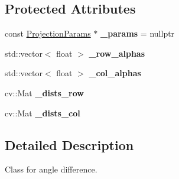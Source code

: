 \subsection*{Protected Attributes}
\begin{DoxyCompactItemize}
\item 
\hypertarget{classdepth__clustering_1_1LineDistDiffPrecomputed_aeb0f0894cc1f1fcbd9d40813005432f3}{const \hyperlink{classdepth__clustering_1_1ProjectionParams}{Projection\-Params} $\ast$ {\bfseries \-\_\-params} = nullptr}\label{classdepth__clustering_1_1LineDistDiffPrecomputed_aeb0f0894cc1f1fcbd9d40813005432f3}

\item 
\hypertarget{classdepth__clustering_1_1LineDistDiffPrecomputed_a5694d6392f56f8659f048f6df7f0ba93}{std\-::vector$<$ float $>$ {\bfseries \-\_\-row\-\_\-alphas}}\label{classdepth__clustering_1_1LineDistDiffPrecomputed_a5694d6392f56f8659f048f6df7f0ba93}

\item 
\hypertarget{classdepth__clustering_1_1LineDistDiffPrecomputed_a0c9b6dc3de39f95b8a76061e94e85505}{std\-::vector$<$ float $>$ {\bfseries \-\_\-col\-\_\-alphas}}\label{classdepth__clustering_1_1LineDistDiffPrecomputed_a0c9b6dc3de39f95b8a76061e94e85505}

\item 
\hypertarget{classdepth__clustering_1_1LineDistDiffPrecomputed_aa4f24cff932c5d498c01ec71179a5e89}{cv\-::\-Mat {\bfseries \-\_\-dists\-\_\-row}}\label{classdepth__clustering_1_1LineDistDiffPrecomputed_aa4f24cff932c5d498c01ec71179a5e89}

\item 
\hypertarget{classdepth__clustering_1_1LineDistDiffPrecomputed_ac0a7cd72ad073091beaefa1d6b3da4a1}{cv\-::\-Mat {\bfseries \-\_\-dists\-\_\-col}}\label{classdepth__clustering_1_1LineDistDiffPrecomputed_ac0a7cd72ad073091beaefa1d6b3da4a1}

\end{DoxyCompactItemize}


\subsection{Detailed Description}
Class for angle difference. 

